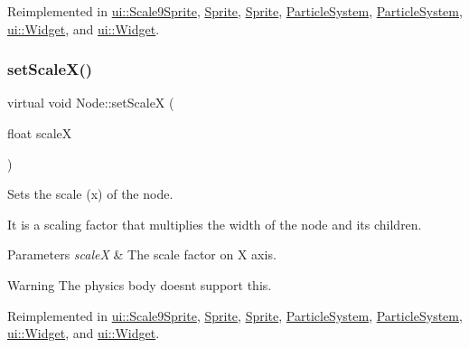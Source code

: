 Reimplemented in \hyperlink{classui_1_1Scale9Sprite_a7f9db0e954aca485c0d37a665927881c}{ui\+::\+Scale9\+Sprite}, \hyperlink{classSprite_af688d9902835f46c9690b29ab5a001a3}{Sprite}, \hyperlink{classSprite_a94c2d64bfcfd193f6b9ec927f9bb44b7}{Sprite}, \hyperlink{classParticleSystem_a48e07e72b7694502ed1375c1df37f9fe}{Particle\+System}, \hyperlink{classParticleSystem_aa1634f3d3f3d13ad5d3c14f901be0bc0}{Particle\+System}, \hyperlink{classui_1_1Widget_a70186a0520486c8706b6326be6453fb4}{ui\+::\+Widget}, and \hyperlink{classui_1_1Widget_a7163529b3d2f436adec05d3ae6c3cb75}{ui\+::\+Widget}.

\mbox{\label{classNode_a49f8182769547584d8d7297b7a946da4}} 
\subsubsection{\texorpdfstring{set\+Scale\+X()}{setScaleX()}\hspace{0.1cm}{\footnotesize\ttfamily [2/2]}}
{\footnotesize\ttfamily virtual void Node\+::set\+ScaleX (\begin{DoxyParamCaption}\item[{float}]{scaleX }\end{DoxyParamCaption})\hspace{0.3cm}{\ttfamily [virtual]}}

Sets the scale (x) of the node.

It is a scaling factor that multiplies the width of the node and its children.


\begin{DoxyParams}{Parameters}
{\em scaleX} & The scale factor on X axis.\\
\hline
\end{DoxyParams}
\begin{DoxyWarning}{Warning}
The physics body doesn\textquotesingle{}t support this. 
\end{DoxyWarning}


Reimplemented in \hyperlink{classui_1_1Scale9Sprite_a7f9db0e954aca485c0d37a665927881c}{ui\+::\+Scale9\+Sprite}, \hyperlink{classSprite_af688d9902835f46c9690b29ab5a001a3}{Sprite}, \hyperlink{classSprite_a94c2d64bfcfd193f6b9ec927f9bb44b7}{Sprite}, \hyperlink{classParticleSystem_a48e07e72b7694502ed1375c1df37f9fe}{Particle\+System}, \hyperlink{classParticleSystem_aa1634f3d3f3d13ad5d3c14f901be0bc0}{Particle\+System}, \hyperlink{classui_1_1Widget_a70186a0520486c8706b6326be6453fb4}{ui\+::\+Widget}, and \hyperlink{classui_1_1Widget_a7163529b3d2f436adec05d3ae6c3cb75}{ui\+::\+Widget}.

